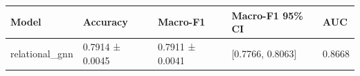 \begin{tabular}{lllll}
\toprule
Model & Accuracy & Macro-F1 & Macro-F1 95\% CI & AUC \\
\midrule
relational\_gnn & 0.7914 ± 0.0045 & 0.7911 ± 0.0041 & [0.7766, 0.8063] & 0.8668 \\
\bottomrule
\end{tabular}
